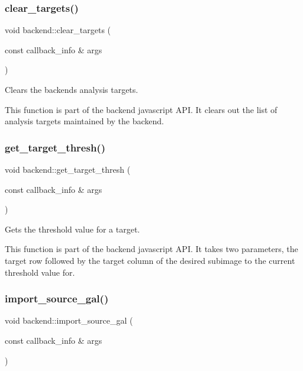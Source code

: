 \subsubsection{\texorpdfstring{clear\+\_\+targets()}{clear\_targets()}}
{\footnotesize\ttfamily void backend\+::clear\+\_\+targets (\begin{DoxyParamCaption}\item[{const callback\+\_\+info \&}]{args }\end{DoxyParamCaption})\hspace{0.3cm}{\ttfamily [static]}}



Clears the backend\textquotesingle{}s analysis targets. 

This function is part of the backend javascript A\+PI. It clears out the list of analysis targets maintained by the backend. \mbox{\label{classbackend_a827177f07a64774f20057d1704e43a5b}} 
\subsubsection{\texorpdfstring{get\+\_\+target\+\_\+thresh()}{get\_target\_thresh()}}
{\footnotesize\ttfamily void backend\+::get\+\_\+target\+\_\+thresh (\begin{DoxyParamCaption}\item[{const callback\+\_\+info \&}]{args }\end{DoxyParamCaption})\hspace{0.3cm}{\ttfamily [static]}}



Gets the threshold value for a target. 

This function is part of the backend javascript A\+PI. It takes two parameters, the target row followed by the target column of the desired subimage to the current threshold value for. \mbox{\label{classbackend_a63f2bdc2cb5376f087935230f6b7831d}} 
\subsubsection{\texorpdfstring{import\+\_\+source\+\_\+gal()}{import\_source\_gal()}}
{\footnotesize\ttfamily void backend\+::import\+\_\+source\+\_\+gal (\begin{DoxyParamCaption}\item[{const callback\+\_\+info \&}]{args }\end{DoxyParamCaption})\hspace{0.3cm}{\ttfamily [static]}}



